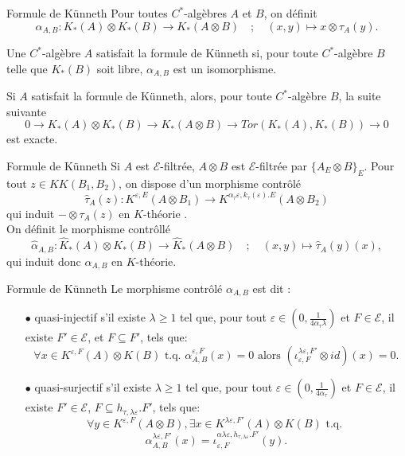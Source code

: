 \begin{frame}{Formule de Künneth}
Pour toutes $C^*$-algèbres $A$ et $B$, on définit
\[\alpha_{A,B} : K_*(A)\otimes K_*(B)\rightarrow K_*(A\otimes B) \quad ; \quad (x,y)\mapsto x\otimes   \tau_A(y).\]

\begin{definitionfr}
Une $C^*$-algèbre $A$ satisfait la formule de Künneth si, pour toute $C^*$-algèbre $B$ telle que $K_*(B)$ soit libre, $\alpha_{A,B}$ est un isomorphisme.
\end{definitionfr}

Si $A$ satisfait la formule de Künneth, alors, pour toute $C^*$-algèbre $B$, la suite suivante
\[0  \rightarrow K_*(A)\otimes K_*(B) \rightarrow K_*(A\otimes B)  \rightarrow Tor(K_*(A),K_*(B)) \rightarrow 0\]
est exacte.

\end{frame}

\begin{frame}{Formule de Künneth}
Si $A$ est $\mathcal E$-filtrée, $A\otimes B$ est $\mathcal E$-filtrée par $\{A_E\otimes B\}_E$. Pour tout $z \in KK(B_1,B_2)$, on dispose d'un morphisme contrôlé 
\[\hat \tau_A (z): K^{\varepsilon,E}(A\otimes B_1 ) \rightarrow K^{\alpha_\tau\varepsilon,k_\tau(\varepsilon).E}(A\otimes B_2)\]
qui induit $-\otimes \tau_A(z) $ en $K$-théorie \cite{OY2}.\\
\vspace{0.3 cm}
On définit le morphisme contrôllé  
\[\hat\alpha_{A,B} : \hat K_*(A)\otimes K_*(B)\rightarrow \hat K_*(A\otimes B) \quad ; \quad (x,y)\mapsto \hat\tau_A(y)(x),\]
qui induit donc $\alpha_{A,B}$ en $K$-théorie.\\
\end{frame}

\begin{frame}{Formule de Künneth}
Le morphisme contrôlé $\alpha_{A,B}$ est dit :
\begin{itemize}
 
\item[$\bullet$] quasi-injectif s'il existe $\lambda \geq 1$ tel que, pour tout $\varepsilon\in (0,\frac{1}{4\alpha_\tau \lambda})$ et $F\in\mathcal E$, il existe $F'\in\mathcal E$, et $F\subseteq F'$, tels que: 
\[\forall x\in K^{\varepsilon,F}(A)\otimes K(B)\text{ t.q. }\alpha_{A,B}^{\varepsilon,F}(x)=0 \text{ alors }(\iota_{\varepsilon,F}^{\lambda\varepsilon,F'}\otimes id) (x) = 0.\] 

\item[$\bullet$] quasi-surjectif s'il existe $\lambda \geq 1$ tel que, pour tout $\varepsilon \in (0,\frac{1}{4\alpha_\tau})$ et $F\in\mathcal E$, il existe $F'\in\mathcal E$, $F\subseteq h_{\tau,\lambda\varepsilon}.F'$, tels que:
\[ \forall y\in K^{\varepsilon,F}(A\otimes B), \exists x\in K^{\lambda\varepsilon, F'}(A)\otimes K(B) \text{ t.q. }\]
\[\alpha^{\lambda\varepsilon,F'}_{A,B}(x)=\iota_{\varepsilon,F}^{\alpha\lambda\varepsilon,h_{\tau, \lambda\varepsilon}.F'}(y).\] 

\end{itemize}
\end{frame}

